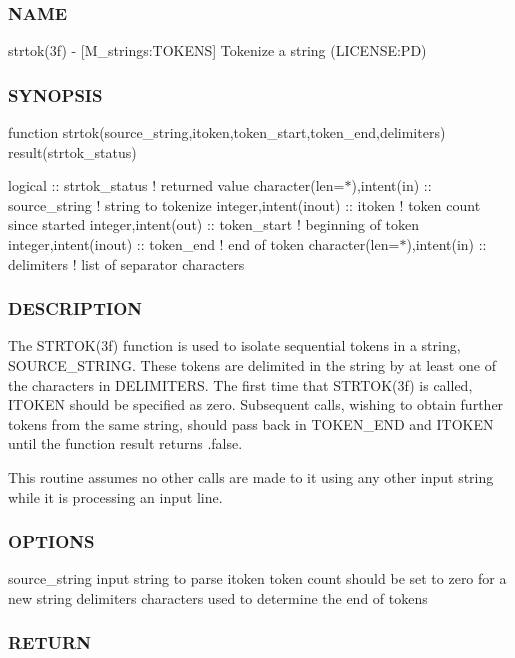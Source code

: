 \subsubsection*{N\+A\+ME}

strtok(3f) -\/ \mbox{[}M\+\_\+strings\+:T\+O\+K\+E\+NS\mbox{]} Tokenize a string (L\+I\+C\+E\+N\+SE\+:PD) \subsubsection*{S\+Y\+N\+O\+P\+S\+IS}

function strtok(source\+\_\+string,itoken,token\+\_\+start,token\+\_\+end,delimiters) result(strtok\+\_\+status)

logical \+:\+: strtok\+\_\+status ! returned value character(len=$\ast$),intent(in) \+:\+: source\+\_\+string ! string to tokenize integer,intent(inout) \+:\+: itoken ! token count since started integer,intent(out) \+:\+: token\+\_\+start ! beginning of token integer,intent(inout) \+:\+: token\+\_\+end ! end of token character(len=$\ast$),intent(in) \+:\+: delimiters ! list of separator characters

\subsubsection*{D\+E\+S\+C\+R\+I\+P\+T\+I\+ON}

The S\+T\+R\+T\+O\+K(3f) function is used to isolate sequential tokens in a string, S\+O\+U\+R\+C\+E\+\_\+\+S\+T\+R\+I\+NG. These tokens are delimited in the string by at least one of the characters in D\+E\+L\+I\+M\+I\+T\+E\+RS. The first time that S\+T\+R\+T\+O\+K(3f) is called, I\+T\+O\+K\+EN should be specified as zero. Subsequent calls, wishing to obtain further tokens from the same string, should pass back in T\+O\+K\+E\+N\+\_\+\+E\+ND and I\+T\+O\+K\+EN until the function result returns .false.

This routine assumes no other calls are made to it using any other input string while it is processing an input line.

\subsubsection*{O\+P\+T\+I\+O\+NS}

source\+\_\+string input string to parse itoken token count should be set to zero for a new string delimiters characters used to determine the end of tokens \subsubsection*{R\+E\+T\+U\+RN}

